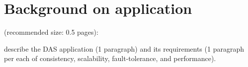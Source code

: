 \section{Background on application}

 (recommended size: 0.5 pages): 
 
describe the DAS
application (1 paragraph) and its requirements (1 paragraph per each of consistency,
scalability, fault-tolerance, and performance).
